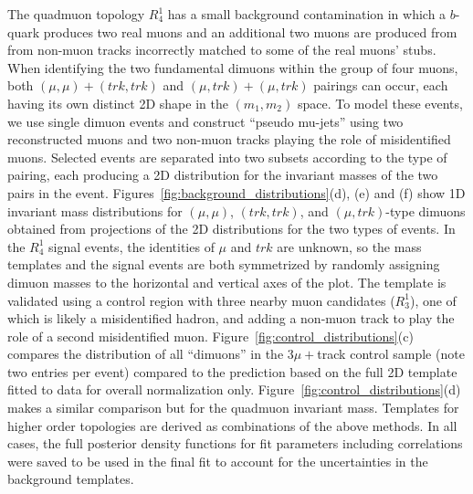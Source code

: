 The quadmuon topology $R^1_4$ has a small background contamination in which a $b$-quark produces two real muons and an additional two muons are produced from from non-muon tracks incorrectly matched to some of the real muons' stubs. When identifying the two fundamental dimuons within the group of four muons, both $(\mu , \mu)+(trk ,trk)$ and $(\mu ,trk)+ (\mu, trk)$ pairings can occur, each having its own distinct 2D shape in the $(m_1,m_2)$ space. To model these events, we use single dimuon events and construct ``pseudo mu-jets'' using two reconstructed muons and two non-muon tracks playing the role of misidentified muons. Selected events are separated into two subsets according to the type of pairing, each producing a 2D distribution for the invariant masses of the two pairs in the event. Figures~\ref{fig:background_distributions}(d), (e) and (f) show 1D invariant mass distributions for $(\mu , \mu)$, $(trk ,trk)$, and $(\mu ,trk)$-type dimuons obtained from projections of the 2D distributions for the two types of events. In the $R^1_4$ signal events, the identities of $\mu$ and $trk$ are unknown, so the mass templates and the signal events are both symmetrized by randomly assigning dimuon masses to the horizontal and vertical axes of the plot. The template is validated using a control region with three nearby muon candidates ($R^1_3$), one of which is likely a misidentified hadron, and adding a non-muon track to play the role of a second misidentified muon. Figure~\ref{fig:control_distributions}(c) compares the distribution of all ``dimuons'' in the $3\mu+$track control sample (note two entries per event) compared to the prediction based on the full 2D template fitted to data for overall normalization only. Figure~\ref{fig:control_distributions}(d) makes a similar comparison but for the quadmuon invariant mass. Templates for higher order topologies are derived as combinations of the above methods. In all cases, the full posterior density functions for fit parameters including correlations were saved to be used in the final fit to account for the uncertainties in the background templates.

